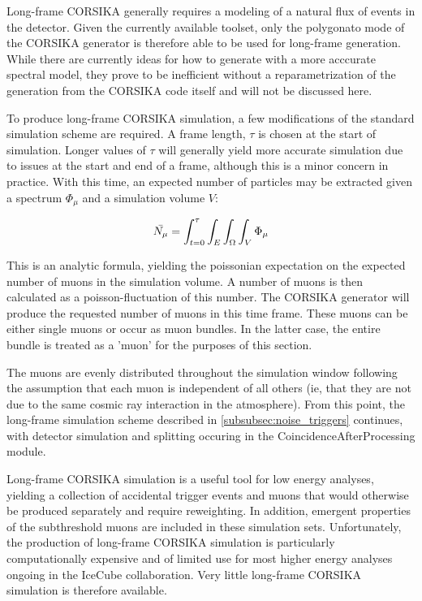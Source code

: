Long-frame CORSIKA generally requires a modeling of a natural flux of events in the detector.
Given the currently available toolset, only the polygonato mode of the CORSIKA generator is therefore able to be used for long-frame generation.
While there are currently ideas for how to generate with a more acccurate spectral model, they prove to be inefficient without a reparametrization of the generation from the CORSIKA code itself and will not be discussed here.

To produce long-frame CORSIKA simulation, a few modifications of the standard simulation scheme are required.
A frame length, $\tau$ is chosen at the start of simulation. 
Longer values of $\tau$ will generally yield more accurate simulation due to issues at the start and end of a frame, although this is a minor concern in practice.
With this time, an expected number of particles may be extracted given a spectrum $\Phi_\mu$ and a simulation volume $V$:

\begin{equation}
	\label{eq:n_{expected}}
	\bar{N_{\mu}} = \int_{t=0}^{\tau} \int_E \int_\Omega \int_V \Phi_\mu
\end{equation}

This is an analytic formula, yielding the poissonian expectation on the expected number of muons in the simulation volume.
A number of muons is then calculated as a poisson-fluctuation of this number.
The CORSIKA generator will produce the requested number of muons in this time frame.
These muons can be either single muons or occur as muon bundles.
In the latter case, the entire bundle is treated as a 'muon' for the purposes of this section.

The muons are evenly distributed throughout the simulation window following the assumption that each muon is independent of all others (ie, that they are not due to the same cosmic ray interaction in the atmosphere).
From this point, the long-frame simulation scheme described in \ref{subsubsec:noise_triggers} continues, with detector simulation and splitting occuring in the CoincidenceAfterProcessing module.

Long-frame CORSIKA simulation is a useful tool for low energy analyses, yielding a collection of accidental trigger events and muons that would otherwise be produced separately and require reweighting.
In addition, emergent properties of the subthreshold muons are included in these simulation sets.
Unfortunately, the production of long-frame CORSIKA simulation is particularly computationally expensive and of limited use for most higher energy analyses ongoing in the IceCube collaboration.
Very little long-frame CORSIKA simulation is therefore available.

